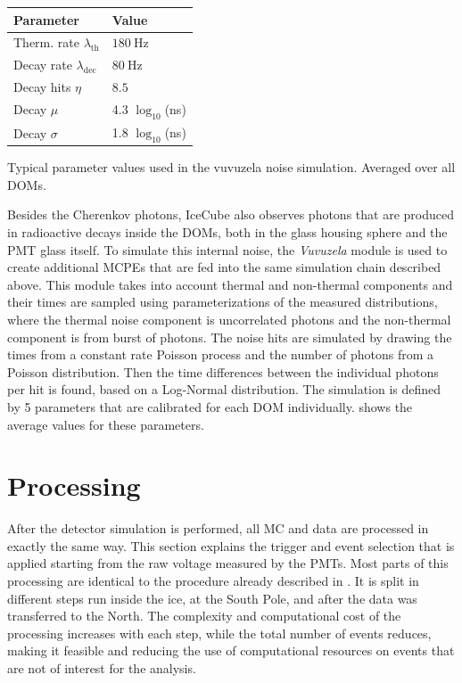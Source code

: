 \begin{margintable}
\small
    \begin{tabular}{ ll }
    \hline\hline

    \textbf{Parameter} & \textbf{Value} \\ 

    \hline\hline

    Therm. rate $\lambda_\mathrm{th}$ & $\SI{180}{\hertz}$ \\
    Decay rate $\lambda_\mathrm{dec}$ & $\SI{80}{\hertz}$ \\
    Decay hits $\eta$ &  $8.5$ \\
    Decay $\mu$ & 4.3 $\log_{10}$(\si{\nano\second}) \\
    Decay $\sigma$ & 1.8 $\log_{10}$(\si{\nano\second}) \\

    \hline
    \end{tabular}
\caption[Vuvuzela noise simulation parameters]{Typical parameter values used in the vuvuzela noise simulation. Averaged over all DOMs.}
\end{margintable}

Besides the Cherenkov photons, IceCube also observes photons that are produced in radioactive decays inside the DOMs, both in the glass housing sphere and the PMT glass itself. To simulate this internal noise, the \emph{Vuvuzela} module  is used to create additional MCPEs that are fed into the same simulation chain described above. This module takes into account thermal and non-thermal components and their times are sampled using parameterizations of the measured distributions, where the thermal noise component is uncorrelated photons and the non-thermal component is from burst of photons. The noise hits are simulated by drawing the times from a constant rate Poisson process and the number of photons from a Poisson distribution. Then the time differences between the individual photons per hit is found, based on a Log-Normal distribution. The simulation is defined by 5 parameters that are calibrated for each DOM individually.  shows the average values for these parameters.


\section{Processing} 

After the detector simulation is performed, all MC and data are processed in exactly the same way. This section explains the trigger and event selection that is applied starting from the raw voltage measured by the PMTs. Most parts of this processing are identical to the procedure already described in . It is split in different steps run inside the ice, at the South Pole, and after the data was transferred to the North. The complexity and computational cost of the processing increases with each step, while the total number of events reduces, making it feasible and reducing the use of computational resources on events that are not of interest for the analysis. 


